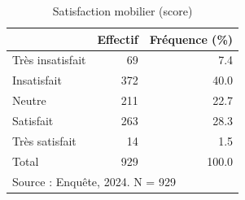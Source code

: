 \begin{table}[htbp]\centering
\def\sym#1{\ifmmode^{#1}\else\(^{#1}\)\fi}
\caption{Satisfaction mobilier (score)}
\begin{tabular}{l*{2}{r}}
\toprule
            &    Effectif&Fréquence (\%)\\
\midrule
Très insatisfait&          69&         7.4\\
Insatisfait &         372&        40.0\\
Neutre      &         211&        22.7\\
Satisfait   &         263&        28.3\\
Très satisfait&          14&         1.5\\
Total       &         929&       100.0\\
\bottomrule
\multicolumn{3}{l}{\footnotesize Source : Enquête, 2024. N = 929}\\
\end{tabular}
\end{table}
